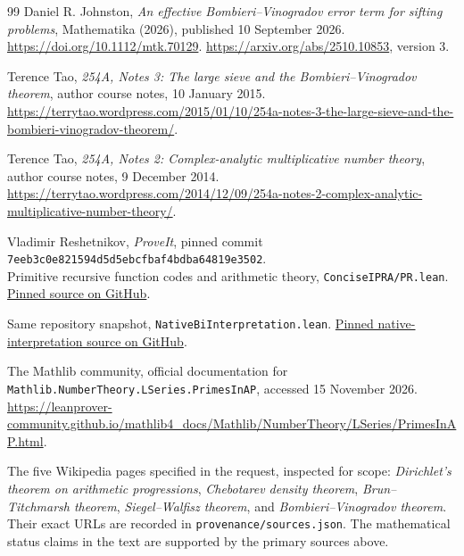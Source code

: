 \begin{thebibliography}{99}
Daniel R. Johnston,
\emph{An effective Bombieri--Vinogradov error term for sifting problems},
Mathematika (2026), published 10 September 2026.
\url{https://doi.org/10.1112/mtk.70129}.
\url{https://arxiv.org/abs/2510.10853}, version 3.

Terence Tao, \emph{254A, Notes 3: The large sieve and the Bombieri--Vinogradov theorem},
author course notes, 10 January 2015.
\url{https://terrytao.wordpress.com/2015/01/10/254a-notes-3-the-large-sieve-and-the-bombieri-vinogradov-theorem/}.

Terence Tao, \emph{254A, Notes 2: Complex-analytic multiplicative number theory},
author course notes, 9 December 2014.
\url{https://terrytao.wordpress.com/2014/12/09/254a-notes-2-complex-analytic-multiplicative-number-theory/}.

Vladimir Reshetnikov, \emph{ProveIt}, pinned commit\\
\texttt{7eeb3c0e821594d5d5ebcfbaf4bdba64819e3502}.\\
Primitive recursive function codes and arithmetic theory, \texttt{ConciseIPRA/PR.lean}.
\href{https://github.com/VladimirReshetnikov/ProveIt/blob/7eeb3c0e821594d5d5ebcfbaf4bdba64819e3502/Logic/PrimitiveRecursiveArithmetic/ConciseIPRA/Lean/ConciseIPRA/PR.lean}{Pinned source on GitHub}.

Same repository snapshot, \texttt{NativeBiInterpretation.lean}.
\href{https://github.com/VladimirReshetnikov/ProveIt/blob/7eeb3c0e821594d5d5ebcfbaf4bdba64819e3502/Logic/PrimitiveRecursiveArithmetic/ConciseIPRA/Lean/ConciseIPRA/NativeBiInterpretation.lean}{Pinned native-interpretation source on GitHub}.

The Mathlib community, official documentation for
\texttt{Mathlib.NumberTheory.LSeries.PrimesInAP}, accessed 15 November 2026.
\url{https://leanprover-community.github.io/mathlib4_docs/Mathlib/NumberTheory/LSeries/PrimesInAP.html}.

The five Wikipedia pages specified in the request, inspected for scope:
\emph{Dirichlet's theorem on arithmetic progressions},
\emph{Chebotarev density theorem},
\emph{Brun--Titchmarsh theorem},
\emph{Siegel--Walfisz theorem}, and
\emph{Bombieri--Vinogradov theorem}.
Their exact URLs are recorded in \texttt{provenance/sources.json}.
The mathematical status claims in the text are supported by the primary
sources above.

\end{thebibliography}
